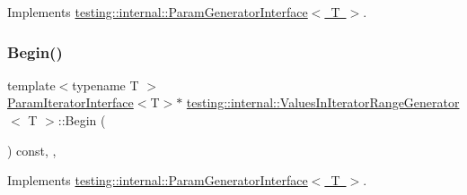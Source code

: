 Implements \mbox{\hyperlink{classtesting_1_1internal_1_1_param_generator_interface_ae1de83b16fe9a53c67778a026c6a9569}{testing\+::internal\+::\+Param\+Generator\+Interface$<$ T $>$}}.

\mbox{\label{classtesting_1_1internal_1_1_values_in_iterator_range_generator_a71ffed6f1deba05f11c9d45f6ab5b85d}} 
\subsubsection{\texorpdfstring{Begin()}{Begin()}\hspace{0.1cm}{\footnotesize\ttfamily [2/3]}}
{\footnotesize\ttfamily template$<$typename T $>$ \\
\mbox{\hyperlink{classtesting_1_1internal_1_1_param_iterator_interface}{Param\+Iterator\+Interface}}$<$T$>$$\ast$ \mbox{\hyperlink{classtesting_1_1internal_1_1_values_in_iterator_range_generator}{testing\+::internal\+::\+Values\+In\+Iterator\+Range\+Generator}}$<$ T $>$\+::Begin (\begin{DoxyParamCaption}{ }\end{DoxyParamCaption}) const\hspace{0.3cm}{\ttfamily [inline]}, {\ttfamily [override]}, {\ttfamily [virtual]}}



Implements \mbox{\hyperlink{classtesting_1_1internal_1_1_param_generator_interface_ae1de83b16fe9a53c67778a026c6a9569}{testing\+::internal\+::\+Param\+Generator\+Interface$<$ T $>$}}.

\mbox{\label{classtesting_1_1internal_1_1_values_in_iterator_range_generator_a71ffed6f1deba05f11c9d45f6ab5b85d}} 
